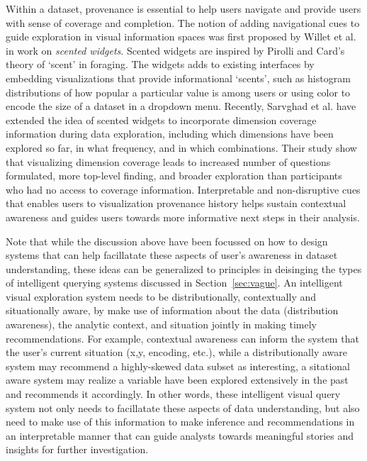 \par Within a dataset, provenance is essential to help users navigate and provide users with sense of coverage and completion. The notion of adding navigational cues to guide exploration in visual information spaces was first proposed by Willet et al.\cite{Willett2007} in work on \textit{scented widgets}. Scented widgets are inspired by Pirolli and Card's theory of `scent' in foraging. The widgets adds to existing interfaces by embedding visualizations that provide informational `scents', such as histogram distributions of how popular a particular value is among users or using color to encode the size of a dataset in a dropdown menu. Recently, Sarvghad et al. \cite{Sarvghad2017} have extended the idea of scented widgets to incorporate dimension coverage information during data exploration, including which dimensions have been explored so far, in what frequency, and in which combinations. Their study show that visualizing dimension coverage leads to increased number of questions formulated, more top-level finding, and broader exploration than participants who had no access to coverage information. Interpretable and non-disruptive cues that enables users to visualization provenance history helps sustain contextual awareness and guides users towards more informative next steps in their analysis.

\par Note that while the discussion above have been focussed on how to design systems that can help facillatate these aspects of user's awareness in dataset understanding, these ideas can be generalized to principles in deisinging the types of intelligent querying systems discussed in Section~\ref{sec:vague}. An intelligent visual exploration system needs to be distributionally, contextually and situationally aware, by make use of information about the data (distribution awareness), the analytic context, and situation jointly in making timely recommendations. For example, contextual awareness can inform the system that the user's current situation (x,y, encoding, etc.), while a distributionally aware system may recommend a highly-skewed data subset as interesting, a sitational aware system may realize a variable have been explored extensively in the past and recommends it accordingly. In other words, these intelligent visual query system not only needs to facillatate these aspects of data understanding, but also need to make use of this information to make inference and recommendations in an interpretable manner that can guide analysts towards meaningful stories and insights for further investigation.

